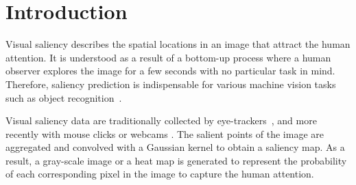 \documentclass[times,twocolumn,final,authoryear]{elsarticle}
\begin{document}

\section{Introduction}
\label{sec:Motivation}

Visual saliency describes the spatial locations in an image that attract the human attention.  It is understood as a result of a bottom-up process where a human observer explores the image for a few seconds with no particular task in mind. Therefore, saliency prediction is indispensable for various machine vision tasks such as object recognition~\citep{walther2002attentional}.

Visual saliency data are traditionally collected by eye-trackers~\citep{judd2009learning}, and more recently with mouse clicks \citep{jiang2015salicon} or webcams \citep{cvpr2016_Khosla}. The salient points of the image are aggregated and convolved with a Gaussian kernel to obtain a saliency map. As a result, a gray-scale image or a heat map is generated to represent the probability of each corresponding pixel in the image to capture the human attention.

\end{document}
